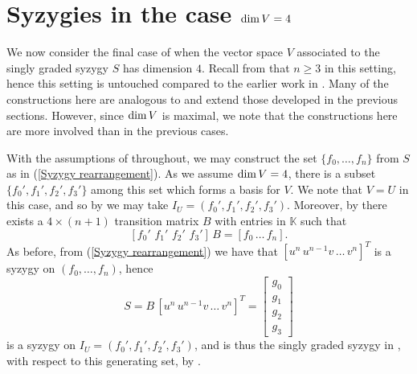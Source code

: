 \documentclass[reqno]{amsart}
\numberwithin{equation}{section}
\theoremstyle{definition}
\def\K{\mathbb{K}}
\def\dim{\mathop{\rm dim}}
\begin{document}





\section{Syzygies in the case $\dim V=4$}\label{dim 4 section}

We now consider the final case of  when the vector space $V$ associated to the singly graded syzygy $S$ has dimension $4$. Recall from  that $n\geq 3$ in this setting, hence this setting is untouched compared to the earlier work in \cite{DS16,Weaver25}. Many of the constructions here are analogous to and extend those developed in the previous sections. However, since $\dim V$ is maximal, we note that the constructions here are more involved than in the previous cases.



With the assumptions of  throughout, we may construct the set $\{f_0,\ldots,f_n\}$ from $S$ as in (\ref{Syzygy rearrangement}). As we assume $\dim V=4$, there is a subset $\{f_0',f_1',f_2',f_3'\}$ among this set which forms a basis for $V$. We note that $V=U$ in this case, and so by  we may take $I_U = (f_0',f_1',f_2',f_3')$. Moreover, by  there exists a $4\times (n+1)$ transition matrix $B$ with entries in $\K$ such that 
$$[f_0'\, \,f_1'\,\,f_2'\,\,f_3']\, B= [f_0\,\ldots\,f_n].$$
As before, from (\ref{Syzygy rearrangement}) we have that $[u^n\, u^{n-1}v\, \ldots \,v^n]^T$ is a syzygy on $(f_0,\ldots,f_n)$, hence
\begin{equation}\label{dim 4 - single graded syzygy}
S=B\, [u^n\, u^{n-1}v\, \ldots \,v^n]^T = \begin{bmatrix}
    g_0\\
    g_1\\
    g_2\\
    g_3
\end{bmatrix}    
\end{equation}
 is a syzygy on $I_U=(f_0',f_1',f_2',f_3')$, and is thus the singly graded syzygy in , with respect to this generating set, by . 
 
\end{document}
